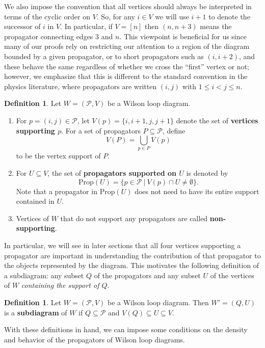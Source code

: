 \documentclass[11pt]{article}
\newcommand{\cP}{\mathcal{P}}
\newcommand{\Prop}{\textrm{Prop}}
\theoremstyle{remark}
\theoremstyle{definition}
\newtheorem{dfn}[thm]{Definition}
\begin{document}
We also impose the convention that all vertices should always be interpreted in terms of the cyclic order on $V$.  So, for any $i\in V$ we will use $i+1$ to denote the successor of $i$ in $V$.   In particular, if $V = [n]$ then $(n,n+3)$ means the propagator connecting edges $3$ and $n$. This viewpoint is beneficial for us since many of our proofs rely on restricting our attention to a region of the diagram bounded by a given propagator, or to short propagators such as $(i,i+2)$, and these behave the same regardless of whether we cross the ``first'' vertex or not; however, we emphasize that this is different to the standard convention in the physics literature, where propagators are written $(i,j)$ with $1 \leq i<j \leq n$.



\begin{dfn} \label{VPropdfn}
Let $W = (\cP, V)$ be a Wilson loop diagram.
\begin{enumerate}
\item For $p = (i,j) \in \cP$, let $V(p) = \{i, i+1, j, j+1\}$ denote the set of {\bf vertices supporting $p$}. For a set of propagators $P \subseteq \cP$, define 
\[V(P) = \bigcup_{p \in P} V(p)\]
to be the vertex support of $P$.
\item For $U \subseteq V$, the set of {\bf propagators supported on $U$} is denoted by
\[\Prop(U) = \{ p \in \cP\ |\ V(p) \cap U \neq \emptyset \}.\]
Note that a propagator in $\Prop(U)$ does not need to have its entire support contained in $U$. 
\item Vertices of $W$ that do not support any propagators are called {\bf non-supporting}.
\end{enumerate}
\end{dfn}

In particular, we will see in later sections that all four vertices supporting a propagator are important in understanding the contribution of that propagator to the objects represented by the diagram. This motivates the following definition of a subdiagram: any subset $Q$ of the propagators and any subset $U$ of the vertices of $W$ {\em containing the support of $Q$}.

\begin{dfn} \label{subdiagramdfn}
Let $W = (\cP, V)$ be a Wilson loop diagram. Then $W' = (Q,U)$ is a {\bf subdiagram} of $W$ if $Q \subseteq \cP$ and $V(Q) \subseteq U \subseteq V$.
\end{dfn}



With these definitions in hand, we can impose some conditions on the density and behavior of the propagators of Wilson loop diagrams.
\end{document}
